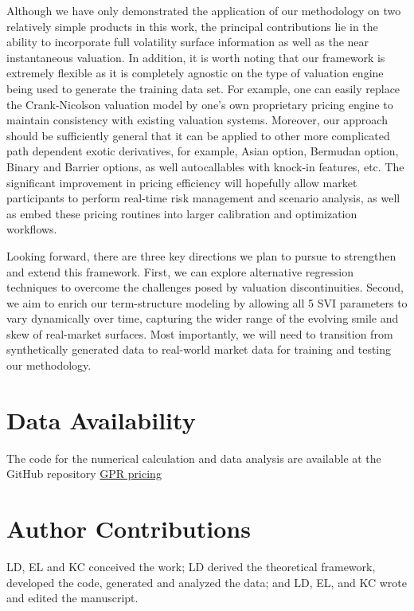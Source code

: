 \documentclass[%
 reprint,
 superscriptaddress,
nobibnotes,
 amsmath,amssymb,
 aps,
]{revtex4-2}
\begin{document}
Although we have only demonstrated the application of our methodology on two relatively simple products in this work, the principal contributions lie in the ability to incorporate full volatility surface information as well as the near instantaneous valuation. In addition, it is worth noting that our framework is extremely flexible as it is completely agnostic on the type of valuation engine being used to generate the training data set. For example, one can easily replace the Crank-Nicolson valuation model by one's own proprietary pricing engine to maintain consistency with existing valuation systems. Moreover, our approach should be sufficiently general that it can be applied to other more complicated path dependent exotic derivatives, for example, Asian option\cite{rogers1995value}, Bermudan option\cite{schweizer2002bermudan, longstaff2001valuing}, Binary and Barrier options, as well autocallables \cite{guillaume2015autocallable} with knock-in features, etc. The significant improvement in pricing efficiency will hopefully allow market participants to perform real-time risk management and scenario analysis, as well as embed these pricing routines into larger calibration and optimization workflows. 

Looking forward, there are three key directions we plan to pursue to strengthen and extend this framework. First, we can explore alternative regression techniques to overcome the challenges posed by valuation discontinuities. Second, we aim to enrich our term-structure modeling by allowing all 5 SVI parameters to vary dynamically over time, capturing the wider range of the evolving smile and skew of real-market surfaces. Most importantly, we will need to transition from synthetically generated data to real-world market data for training and testing our methodology. 


\section{Data Availability}
The code for the numerical calculation and data analysis are available at the GitHub repository \href{https://github.com/ljding94/GPR_pricing}{GPR pricing}

\section{Author Contributions}
LD, EL and KC conceived the work; LD derived the theoretical framework, developed the code, generated and analyzed the data; and LD, EL, and KC wrote and edited the manuscript.
\end{document}
